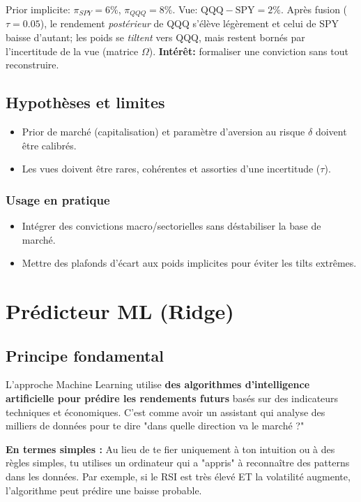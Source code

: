 \documentclass[11pt,a4paper]{article}
\begin{document}
\begin{tcolorbox}[title=Exemple chiffré — Vue QQQ vs SPY]
Prior implicite: \(\pi_{SPY}=6\%\), \(\pi_{QQQ}=8\%\). Vue: \(\text{QQQ}-\text{SPY}=2\%\). Après fusion (\(\tau=0.05\)), le rendement \emph{postérieur} de QQQ s'élève légèrement et celui de SPY baisse d'autant; les poids se \emph{tiltent} vers QQQ, mais restent bornés par l'incertitude de la vue (matrice \(\Omega\)). \textbf{Intérêt:} formaliser une conviction sans tout reconstruire.
\end{tcolorbox}

\subsection{Hypothèses et limites}
\begin{itemize}
  \item Prior de marché (capitalisation) et paramètre d'aversion au risque \(\delta\) doivent être calibrés.
  \item Les vues doivent être rares, cohérentes et assorties d'une incertitude (\(\tau\)).
\end{itemize}

\subsubsection*{Usage en pratique}
\begin{itemize}
  \item Intégrer des convictions macro/sectorielles sans déstabiliser la base de marché.
  \item Mettre des plafonds d'écart aux poids implicites pour éviter les tilts extrêmes.
\end{itemize}

\FloatBarrier
\section{Prédicteur ML (Ridge)}

\subsection{Principe fondamental}
L'approche Machine Learning utilise \textbf{des algorithmes d'intelligence artificielle pour prédire les rendements futurs} basés sur des indicateurs techniques et économiques. C'est comme avoir un assistant qui analyse des milliers de données pour te dire "dans quelle direction va le marché ?"

\textbf{En termes simples :} Au lieu de te fier uniquement à ton intuition ou à des règles simples, tu utilises un ordinateur qui a "appris" à reconnaître des patterns dans les données. Par exemple, si le RSI est très élevé ET la volatilité augmente, l'algorithme peut prédire une baisse probable.
\end{document}
